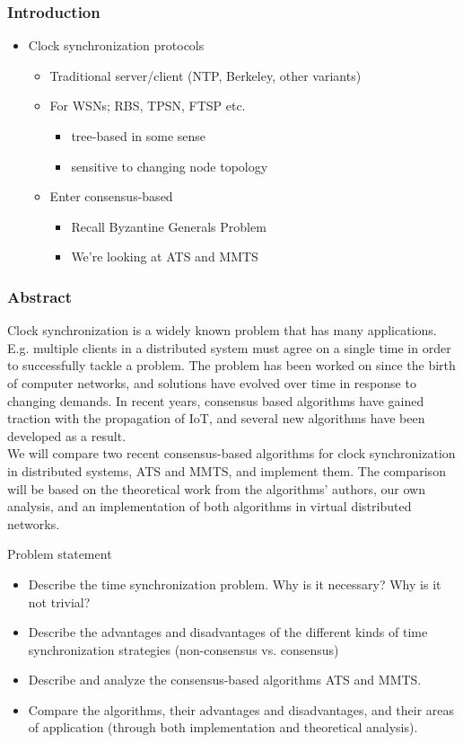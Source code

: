 \documentclass{beamer}
\begin{document}
\begin{frame}
  \frametitle{Introduction}
  \begin{itemize}
  \item<1-> Clock synchronization protocols
    \begin{itemize}
    \item<2-> Traditional server/client (NTP, Berkeley, other variants)
    \item<3-> For WSNs; RBS, TPSN, FTSP etc.      
      \begin{itemize}
      \item<4-> tree-based in some sense
      \item<5-> sensitive to changing node topology
      \end{itemize}      
    \item<6-> Enter consensus-based
      \begin{itemize}
      \item<7-> Recall Byzantine Generals Problem
      \item<8-> We're looking at ATS and MMTS
      \end{itemize}
    \end{itemize}
  \end{itemize}
\end{frame}

\begin{frame}
\frametitle{Abstract}
Clock synchronization is a widely known problem that has many applications. E.g. multiple clients in a distributed system must agree on a single time in order to successfully tackle a problem. The problem has been worked on since the birth of computer networks, and solutions have evolved over time in response to changing demands. In recent years, consensus based algorithms have gained traction with the propagation of IoT, and several new algorithms have been developed as a result.\\
\vspace{1em}
We will compare two recent consensus-based algorithms for clock synchronization in distributed systems, ATS and MMTS, and implement them. The comparison will be based on the theoretical work from the algorithms' authors, our own analysis, and an implementation of both algorithms in virtual distributed networks.
\end{frame}

\begin{frame}{Problem statement}
\begin{itemize}
    \item<1-> Describe the time synchronization problem. Why is it necessary? Why is it not trivial? 
    \item<2-> Describe the advantages and disadvantages of the different kinds of time synchronization strategies (non-consensus vs. consensus)
    \item<3-> Describe and analyze the consensus-based algorithms ATS and MMTS.
    \item<4-> Compare the algorithms, their advantages and disadvantages, and their areas of application (through both implementation and theoretical analysis).
\end{itemize}

\end{frame}
 
\end{document}
